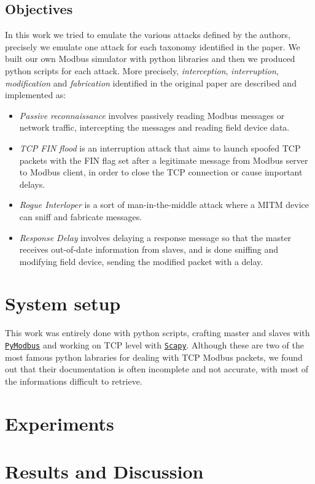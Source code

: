 \documentclass[12pt]{article}
\begin{document}
\subsection{Objectives}
In this work we tried to emulate the various attacks defined by the authors, precisely we emulate one attack for each taxonomy identified in the paper. We built our own Modbus simulator with python libraries and then we produced python scripts for each attack.
More precisely, \textit{interception}, \textit{interruption}, \textit{modification} and \textit{fabrication} identified in the original paper are described and implemented as:
\begin{itemize}
    \item \textit{Passive reconnaissance} involves passively reading Modbus messages or network traffic, intercepting the messages and reading field device data.
    \item \textit{TCP FIN flood} is an interruption attack that aims to launch spoofed TCP packets with the FIN flag set after a legitimate message from Modbus server to Modbus client, in order to close the TCP connection or cause important delays.
    \item \textit{Rogue Interloper} is a sort of man-in-the-middle attack where a MITM device can sniff and fabricate messages.
    \item \textit{Response Delay} involves delaying a response message so that the master receives out-of-date information from slaves, and is done sniffing and modifying field device, sending the modified packet with a delay.
\end{itemize}

\section{System setup}
This work was entirely done with python scripts, crafting master and slaves with \href{https://pymodbus.readthedocs.io/en/latest/}{\texttt{PyModbus}} and working on TCP level with \href{https://scapy.readthedocs.io/en/latest/}{\texttt{Scapy}}.
Although these are two of the most famous python labraries for dealing with TCP Modbus packets, we found out that their documentation is often incomplete and not accurate, with most of the informations difficult to retrieve. 

\section{Experiments}
\section{Results and Discussion}
\printbibliography 
\end{document}
